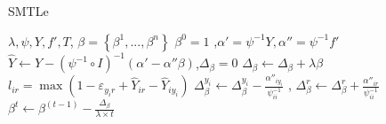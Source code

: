 \begin{algorithm}\label{alg:1}
       \caption{SMTLe}\label{alg:1}
        \begin{algorithmic}[1]
            \REQUIRE $\lambda, \psi,Y,f',T$,
            \ENSURE $\beta=\left\{\beta^1,...,\beta^n\right\}$
            \STATE $\beta^0 = 1$
            ,$\alpha' = \psi^{-1}Y,\alpha'' = \psi^{-1}f'$
                \STATE $\hat Y \leftarrow Y - {\left( {\psi^{-1} \circ I} \right)^{ - 1}}\left( \alpha' - \alpha''\beta \right)$,\qquad${\Delta _\beta }=0$ 
                	\STATE ${\Delta _\beta }\leftarrow {\Delta _\beta }+\lambda\beta$ 
	                    \STATE $l_{ir} = \max(1 - {\varepsilon _{{y_i}r}} + {\hat Y_{ir}} - {\hat Y_{i{y_i}}})$
	                            \STATE $\Delta _\beta^{{y_i}} \leftarrow \Delta _\beta^{{y_i}} - \frac{{{\alpha''_{i{y_i}}}}}{{{\psi^{-1}_{ii}}}}$%
	                            , $\Delta _\beta^{{r}} \leftarrow \Delta _\beta^{{r}} + \frac{{{\alpha''_{i{r}}}}}{{{\psi^{-1}_{ii}}}}$%
	                    \ENDIF
                \ENDFOR %
                \STATE $\beta^t  \leftarrow \beta^{(t-1)}  - \frac{{{\Delta _\beta }}}{{\lambda\times {t} }}$
             \ENDFOR %
        \end{algorithmic}
\end{algorithm}